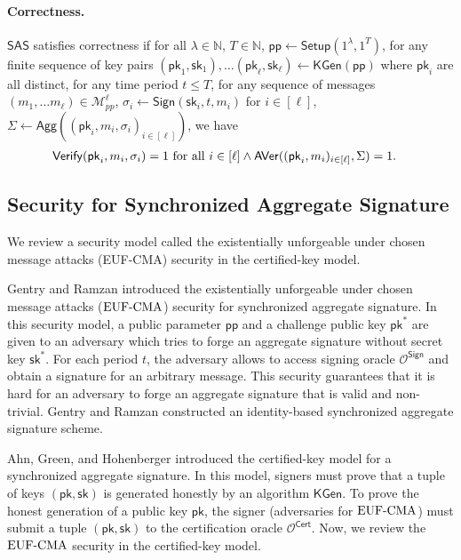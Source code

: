 \documentclass[a4paper,11pt]{fullverllncs}
\newcommand{\sk}{\mathsf{sk}}
\newcommand{\pk}{\mathsf{pk}}
\newcommand{\pp}{\mathsf{pp}}
\newcommand{\Setup}{\mathsf{Setup}}
\newcommand{\KGen}{\mathsf{KGen}}
\newcommand{\Sign}{\mathsf{Sign}}
\newcommand{\Verify}{\mathsf{Verify}}
\newcommand{\Agg}{\mathsf{Agg}}
\newcommand{\AVer}{\mathsf{AVer}}
\newcommand{\rmEUFCMA}{\mathrm{EUF}\mathchar`-\mathrm{CMA}}
\newcommand{\Cert}{\mathsf{Cert}}
\newcommand{\SAS}{\mathsf{SAS}}
\begin{document}
\begin{definition} 
\paragraph{\bf Correctness.}
$\SAS$ satisfies correctness if for all $\lambda \in \mathbb{N}$, $T \in \mathbb{N}$, $\pp \leftarrow \Setup(1^\lambda, 1^{T})$, for any finite sequence of key pairs $(\pk_1, \sk_1),\dots (\pk_\ell, \sk_\ell) \leftarrow \KGen (\pp)$ where $\pk_i$ are all distinct, for any time period $t \leq T$, for any sequence of messages $(m_1, \dots m_\ell) \in \mathcal{M}_{pp}^{\ell}$, 
$\sigma_i \leftarrow \Sign (\sk_i, t, m_i)$ for $i \in [\ell]$, 
$\Sigma \leftarrow \Agg((\pk_i, m_i, \sigma_i)_{i \in [\ell]})$, we have
\begin{equation*}
\begin{split}
\Verify &(\pk_i, m_i, \sigma_i) = 1 {\rm \ for \ all \ } i \in [\ell] \land \AVer ((\pk_i, m_i)_{i \in [\ell]}, \Sigma) = 1.
\end{split}
\end{equation*}
\end{definition}



\subsection{Security for Synchronized Aggregate Signature}
We review a security model called the existentially unforgeable under chosen message attacks (EUF-CMA) security in the certified-key model.

Gentry and Ramzan \cite{GR06} introduced the existentially unforgeable under chosen message attacks ($\rmEUFCMA$) security for synchronized aggregate signature.
In this security model, a public parameter $\pp$ and a challenge public key $\pk^*$ are given to an adversary which tries to forge an aggregate signature without secret key $\sk^*$.
For each period $t$, the adversary allows to access signing oracle $\mathcal{O}^{\Sign}$ and obtain a signature for an arbitrary message.
This security guarantees that it is hard for an adversary to forge an aggregate signature that is valid and non-trivial.
Gentry and Ramzan \cite{GR06} constructed an identity-based synchronized aggregate signature scheme.

Ahn, Green, and Hohenberger \cite{AGH10} introduced the certified-key model for a synchronized aggregate signature.
In this model, signers must prove that a tuple of keys $(\pk, \sk)$ is generated honestly by an algorithm $\KGen$. 
To prove the honest generation of a public key $\pk$, the signer (adversaries for $\rmEUFCMA$) must submit a tuple $(\pk, \sk)$ to the certification oracle $\mathcal{O}^{\Cert}$.
Now, we review the $\rmEUFCMA$ security in the certified-key model.
\end{document}
